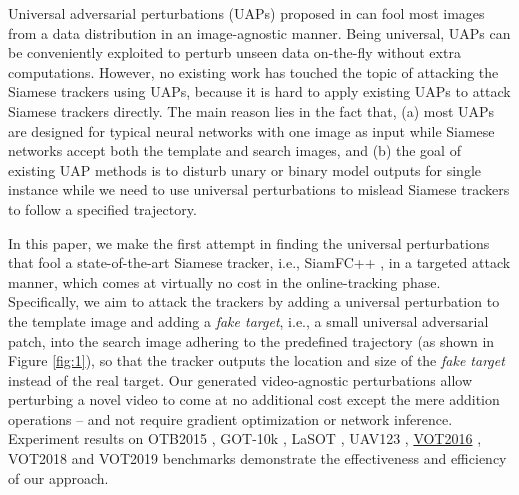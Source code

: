 \documentclass[journal]{IEEEtran}
\newcommand{\ie}{i.e.}
\begin{document}
Universal adversarial perturbations (UAPs) proposed in \cite{UAP} can fool most images from a data distribution in an image-agnostic manner. Being universal, UAPs can be conveniently exploited to perturb unseen data on-the-fly without extra computations. However, no existing work has touched the topic of attacking the Siamese trackers using UAPs, because it is hard to apply existing UAPs to attack Siamese trackers directly. The main reason lies in the fact that, (a) most UAPs are designed for typical neural networks with one image as input while Siamese networks accept both the template and search images, and (b) the goal of existing UAP methods is to disturb unary or binary model outputs for single instance while we need to use universal perturbations to mislead Siamese trackers to follow a specified trajectory.
  
In this paper, we make the first attempt in finding the universal perturbations that fool a state-of-the-art Siamese tracker, \ie, SiamFC++ \cite{SiamFC++}, in a targeted attack manner, which comes at virtually no cost in the online-tracking phase. Specifically, we aim to attack the trackers by adding a universal perturbation to the template image and adding a \textit{fake target}, \ie, a small universal adversarial patch, into the search image adhering to the predefined trajectory (as shown in Figure \ref{fig:1}), so that the tracker outputs the location and size of the \textit{fake target} instead of the real target. Our generated video-agnostic perturbations allow perturbing a novel video to come at no additional cost except the mere addition operations -- and not require gradient optimization or network inference. Experiment results on OTB2015 \cite{OTB}, GOT-10k \cite{GOT-10k}, LaSOT \uline{\cite{LaSOT}}, UAV123 \cite{UAV123}, \uline{VOT2016} \cite{VOT2016}, VOT2018 \cite{VOT2018} and VOT2019 \cite{VOT2019} benchmarks demonstrate the effectiveness and efficiency of our approach.

\end{document}
